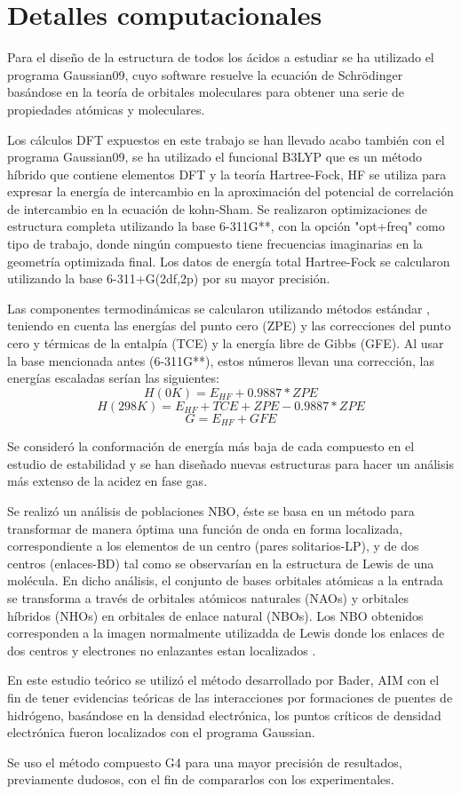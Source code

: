 \chapter{Detalles computacionales}

Para el diseño de la estructura de todos los ácidos a estudiar se ha utilizado el programa Gaussian09, cuyo software resuelve la ecuación de Schrödinger basándose en la teoría de orbitales moleculares para obtener una serie de propiedades atómicas y moleculares.

Los cálculos DFT expuestos en este trabajo se han llevado acabo también con el programa Gaussian09, se ha utilizado el funcional B3LYP que es un método híbrido que contiene elementos DFT y la teoría Hartree-Fock, HF se utiliza para expresar la energía de intercambio en la aproximación del potencial de correlación de intercambio en la ecuación de kohn-Sham. Se realizaron optimizaciones de estructura completa utilizando la base 6-311G**, con la opción "opt+freq" como tipo de trabajo, donde ningún compuesto tiene frecuencias imaginarias en la geometría optimizada final. Los datos de energía total Hartree-Fock se calcularon utilizando la base 6-311+G(2df,2p) por su mayor precisión.


Las componentes termodinámicas se calcularon utilizando métodos estándar \cite {quimica4}, teniendo en cuenta las energías del punto cero (ZPE) y las correcciones del punto cero y térmicas de la entalpía (TCE) y la energía libre de Gibbs (GFE). Al usar la base mencionada antes (6-311G**), estos números llevan una corrección, las energías escaladas serían las siguientes: \\
$$ H (0K) = E_{HF} + 0.9887*ZPE $$ 
$$ H (298K) = E_{HF} + TCE + ZPE - 0.9887*ZPE $$ 
$$G = E_{HF} + GFE $$

Se consideró la conformación de energía más baja de cada compuesto en el estudio de estabilidad y se han diseñado nuevas estructuras para hacer un análisis más extenso de la acidez en fase gas.

Se realizó un análisis de poblaciones NBO, éste se basa en un método para transformar de manera óptima una función de onda en forma localizada, correspondiente a los elementos de un centro (pares solitarios-LP), y de dos centros (enlaces-BD) tal como se observarían en la estructura de Lewis de una molécula. En dicho análisis, el conjunto de bases orbitales atómicas a la entrada se transforma a través de orbitales atómicos naturales (NAOs) y orbitales híbridos (NHOs) en orbitales de enlace natural (NBOs). Los NBO obtenidos corresponden a la imagen normalmente utilizadda de Lewis donde los enlaces de dos centros y electrones no enlazantes estan localizados \cite{quimica5}.

En este estudio teórico se utilizó el método desarrollado por Bader, AIM \cite{quimica6} con el fin de tener evidencias teóricas de las interacciones por formaciones de puentes de hidrógeno, basándose en la densidad electrónica, los puntos críticos de densidad electrónica fueron localizados con el programa Gaussian.

Se uso el método compuesto G4 para una mayor precisión de resultados, previamente dudosos, con el fin de compararlos con los experimentales.
 
